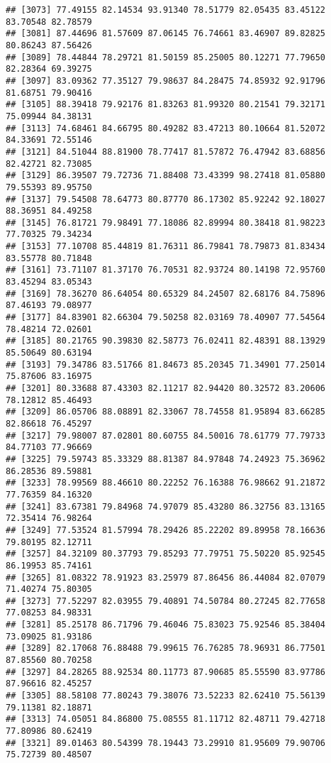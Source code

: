 \documentclass[
]{article}
\begin{document}
\begin{verbatim}
## [3073] 77.49155 82.14534 93.91340 78.51779 82.05435 83.45122 83.70548 82.78579
## [3081] 87.44696 81.57609 87.06145 76.74661 83.46907 89.82825 80.86243 87.56426
## [3089] 78.44844 78.29721 81.50159 85.25005 80.12271 77.79650 82.28364 69.39275
## [3097] 83.09362 77.35127 79.98637 84.28475 74.85932 92.91796 81.68751 79.90416
## [3105] 88.39418 79.92176 81.83263 81.99320 80.21541 79.32171 75.09944 84.38131
## [3113] 74.68461 84.66795 80.49282 83.47213 80.10664 81.52072 84.33691 72.55146
## [3121] 84.51044 88.81900 78.77417 81.57872 76.47942 83.68856 82.42721 82.73085
## [3129] 86.39507 79.72736 71.88408 73.43399 98.27418 81.05880 79.55393 89.95750
## [3137] 79.54508 78.64773 80.87770 86.17302 85.92242 92.18027 88.36951 84.49258
## [3145] 76.81721 79.98491 77.18086 82.89994 80.38418 81.98223 77.70325 79.34234
## [3153] 77.10708 85.44819 81.76311 86.79841 78.79873 81.83434 83.55778 80.71848
## [3161] 73.71107 81.37170 76.70531 82.93724 80.14198 72.95760 83.45294 83.05343
## [3169] 78.36270 86.64054 80.65329 84.24507 82.68176 84.75896 87.46193 79.08977
## [3177] 84.83901 82.66304 79.50258 82.03169 78.40907 77.54564 78.48214 72.02601
## [3185] 80.21765 90.39830 82.58773 76.02411 82.48391 88.13929 85.50649 80.63194
## [3193] 79.34786 83.51766 81.84673 85.20345 71.34901 77.25014 75.87606 83.16975
## [3201] 80.33688 87.43303 82.11217 82.94420 80.32572 83.20606 78.12812 85.46493
## [3209] 86.05706 88.08891 82.33067 78.74558 81.95894 83.66285 82.86618 76.45297
## [3217] 79.98007 87.02801 80.60755 84.50016 78.61779 77.79733 84.77103 77.96669
## [3225] 79.59743 85.33329 88.81387 84.97848 74.24923 75.36962 86.28536 89.59881
## [3233] 78.99569 88.46610 80.22252 76.16388 76.98662 91.21872 77.76359 84.16320
## [3241] 83.67381 79.84968 74.97079 85.43280 86.32756 83.13165 72.35414 76.98264
## [3249] 77.53524 81.57994 78.29426 85.22202 89.89958 78.16636 79.80195 82.12711
## [3257] 84.32109 80.37793 79.85293 77.79751 75.50220 85.92545 86.19953 85.74161
## [3265] 81.08322 78.91923 83.25979 87.86456 86.44084 82.07079 71.40274 75.80305
## [3273] 77.52297 82.03955 79.40891 74.50784 80.27245 82.77658 77.08253 84.98331
## [3281] 85.25178 86.71796 79.46046 75.83023 75.92546 85.38404 73.09025 81.93186
## [3289] 82.17068 76.88488 79.99615 76.76285 78.96931 86.77501 87.85560 80.70258
## [3297] 84.28265 88.92534 80.11773 87.90685 85.55590 83.97786 87.96616 82.45257
## [3305] 88.58108 77.80243 79.38076 73.52233 82.62410 75.56139 79.11381 82.18871
## [3313] 74.05051 84.86800 75.08555 81.11712 82.48711 79.42718 77.80986 80.62419
## [3321] 89.01463 80.54399 78.19443 73.29910 81.95609 79.90706 75.72739 80.48507

\end{verbatim}
\end{document}

